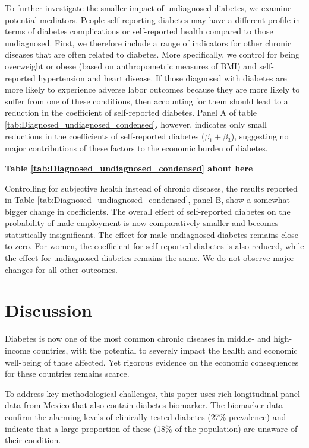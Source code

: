 \documentclass[12pt,english]{article}
\begin{document}
To further investigate the smaller impact of undiagnosed diabetes, we examine potential mediators. People self-reporting diabetes may have a different profile in terms of diabetes complications or self-reported health compared to those undiagnosed. First, we therefore include a range of indicators for other chronic diseases that are often related to diabetes. More specifically, we control for being overweight or obese (based on anthropometric measures of \ac{BMI}) and self-reported hypertension and heart disease. If those diagnosed with diabetes are more likely to experience adverse labor outcomes because they are more likely to suffer from one of these conditions, then accounting for them should lead to a reduction in the coefficient of self-reported diabetes. Panel A of table \ref{tab:Diagnosed_undiagnosed_condensed}, however, indicates only small reductions in the coefficients of self-reported diabetes ($\beta_{1}+\beta_{3}$), suggesting no major contributions of these factors to the economic burden of diabetes. 

\begin{center}
	\textbf{Table \ref{tab:Diagnosed_undiagnosed_condensed} about here}
\end{center}

Controlling for subjective health instead of chronic diseases, the results reported in Table \ref{tab:Diagnosed_undiagnosed_condensed}, panel B, show a somewhat bigger change in coefficients. The overall effect of self-reported diabetes on the probability of male employment is now comparatively smaller and becomes statistically insignificant. The effect for male undiagnosed diabetes remains close to zero. For women, the coefficient for self-reported diabetes is also reduced, while the effect for undiagnosed diabetes remains the same. We do not observe major changes for all other outcomes.   






\section{\label{sec:cha_4_conclusion}Discussion}

Diabetes is now one of the most common chronic diseases in middle- and high-income countries, with the potential to severely impact the health and economic well-being of those affected. Yet rigorous evidence on the economic consequences for these countries
remains scarce. 

To address key methodological challenges, this paper uses rich longitudinal panel data from Mexico that also contain diabetes biomarker. The biomarker data confirm the alarming levels of clinically tested diabetes (27\% prevalence) and indicate that a large proportion of these (18\% of the population) are unaware of their condition.
\end{document}
